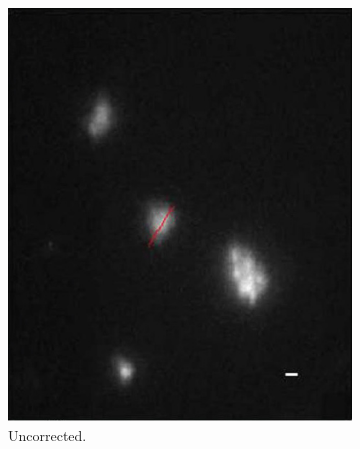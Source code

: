 \begin{figure}[htb]
        \centering
        \begin{subfigure}[b]{0.25\textwidth}
                \includegraphics[width=\textwidth]{images/wide_direct_a}
                \caption{Uncorrected.}
                \label{fig:wide_direct_a}
        \end{subfigure}
				\begin{subfigure}[b]{0.25\textwidth}

\end{subfigure}
\end{figure}
